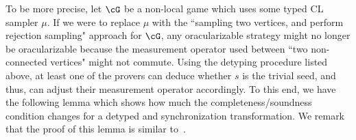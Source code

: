 To be more precise, let $\cG$ be a non-local game which uses some typed CL sampler $\mu$. If we were to replace $\mu$ with the ``sampling two vertices, and perform rejection sampling" approach for $\cG$, any oracularizable strategy might no longer be oracularizable because the measurement operator used between ``two non-connected vertices" might not commute. Using the detyping procedure listed above, at least one of the provers can deduce whether $s$ is the trivial seed, and thus, can adjust their measurement operator accordingly. To this end, we have the following lemma which shows how much the completeness/soundness condition changes for a detyped and synchronization transformation. We remark that the proof of this lemma is similar to~\cite[Lemma 6.18]{jiMIPRE2022a}. 


